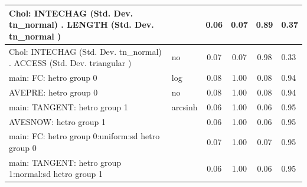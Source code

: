 \begin{table}
\begin{center}
\begin{tabular}{|l|l|c|c|c|l|}
			\hline
			 Chol: INTECHAG (Std. Dev. tn_normal) . LENGTH (Std. Dev.   tn_normal ) &  & 0.06 & 0.07 & 0.89 & 0.37 \\
			\hline
			 Chol: INTECHAG (Std. Dev. tn_normal) . ACCESS (Std. Dev.   triangular ) & no & 0.07 & 0.07 & 0.98 & 0.33 \\
			\hline
			main: FC: hetro group 0 & log & 0.08 & 1.00 & 0.08 & 0.94 \\
			\hline
			AVEPRE: hetro group 0 & no & 0.08 & 1.00 & 0.08 & 0.94 \\
			\hline
			main: TANGENT: hetro group 1 & arcsinh & 0.06 & 1.00 & 0.06 & 0.95 \\
			\hline
			AVESNOW: hetro group 1 &  & 0.06 & 1.00 & 0.06 & 0.95 \\
			\hline
			main: FC: hetro group 0:uniform:sd  hetro group 0 &  & 0.07 & 1.00 & 0.07 & 0.95 \\
			\hline
			main: TANGENT: hetro group 1:normal:sd  hetro group 1 &  & 0.06 & 1.00 & 0.06 & 0.95 \\
			\hline
		\end{tabular}
	\end{center}
\end{table}